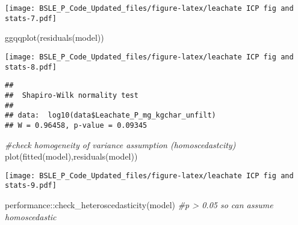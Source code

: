 \documentclass[
]{article}
\newenvironment{Shaded}{\begin{snugshade}}{\end{snugshade}}
\newcommand{\CommentTok}[1]{\textcolor[rgb]{0.56,0.35,0.01}{\textit{#1}}}
\newcommand{\DecValTok}[1]{\textcolor[rgb]{0.00,0.00,0.81}{#1}}
\newcommand{\FloatTok}[1]{\textcolor[rgb]{0.00,0.00,0.81}{#1}}
\newcommand{\FunctionTok}[1]{\textcolor[rgb]{0.00,0.00,0.00}{#1}}
\newcommand{\NormalTok}[1]{#1}
\newcommand{\SpecialCharTok}[1]{\textcolor[rgb]{0.00,0.00,0.00}{#1}}
\begin{document}
\begin{Shaded}
\end{Shaded}

\texttt{[image: BSLE\_P\_Code\_Updated\_files/figure-latex/leachate ICP fig and stats-7.pdf]}

\begin{Shaded}
\begin{Highlighting}[]
\FunctionTok{ggqqplot}\NormalTok{(}\FunctionTok{residuals}\NormalTok{(model))}
\end{Highlighting}
\end{Shaded}

\texttt{[image: BSLE\_P\_Code\_Updated\_files/figure-latex/leachate ICP fig and stats-8.pdf]}

\begin{Shaded}
\end{Shaded}

\begin{verbatim}
## 
##  Shapiro-Wilk normality test
## 
## data:  log10(data$Leachate_P_mg_kgchar_unfilt)
## W = 0.96458, p-value = 0.09345
\end{verbatim}

\begin{Shaded}
\begin{Highlighting}[]
\CommentTok{\#check homogeneity of variance assumption (homoscedastcity)}
\FunctionTok{plot}\NormalTok{(}\FunctionTok{fitted}\NormalTok{(model),}\FunctionTok{residuals}\NormalTok{(model))}
\end{Highlighting}
\end{Shaded}

\texttt{[image: BSLE\_P\_Code\_Updated\_files/figure-latex/leachate ICP fig and stats-9.pdf]}

\begin{Shaded}
\begin{Highlighting}[]
\NormalTok{performance}\SpecialCharTok{::}\FunctionTok{check\_heteroscedasticity}\NormalTok{(model) }\CommentTok{\#p \textgreater{} 0.05 so can assume homoscedastic}
\end{Highlighting}
\end{Shaded}
\end{document}
